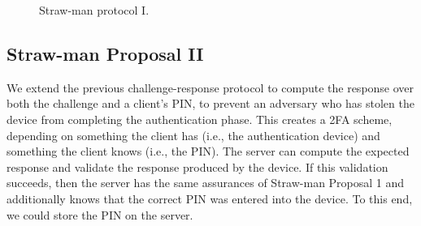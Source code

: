\begin{figure}[!thb]
\begin{tcolorbox}[enhanced,width=4.75in, height=100mm, left=1mm,
    drop fuzzy shadow southwest,
    colframe=black,colback=white]
    {\small{

    \caption{Straw-man protocol I.}
    
    \label{fig:strawman1}
    }}
    \end{tcolorbox}
\end{figure}




\subsection{Straw-man Proposal II}\label{sec:straw-man-2}

We extend the previous challenge-response protocol to compute the response
over both the challenge and a client's PIN, to prevent an adversary who
has stolen the device from completing the authentication phase. This creates a
2FA scheme, depending on something the client has (i.e., the
authentication device) and something the client knows (i.e., the PIN). The
server can compute the
expected response and validate the response produced by the device. If this validation succeeds, then the server has the
same assurances of Straw-man Proposal 1 and additionally knows that the correct
PIN was entered into the device. To this end, we could store the PIN on the server. 


